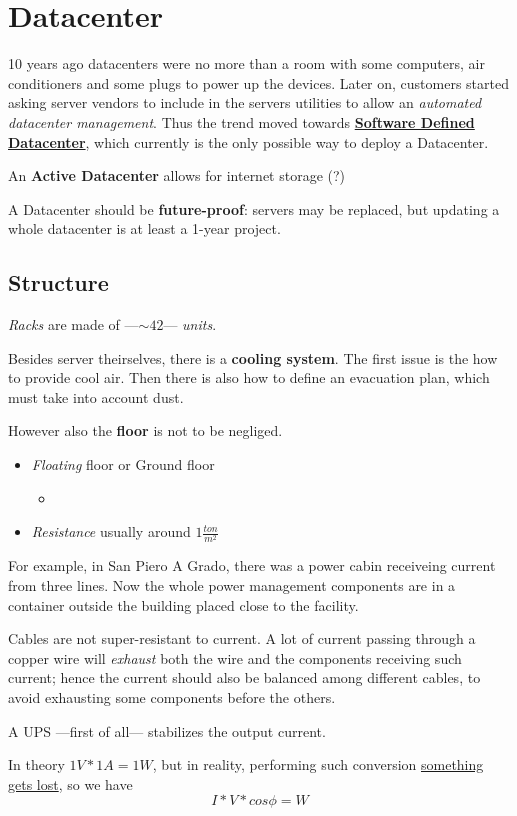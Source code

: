 \chapter{Datacenter}
10 years ago datacenters were no more than a room with some computers, air conditioners and some plugs to power up the devices.
Later on, customers started asking server vendors to include in the servers utilities to allow an \textit{automated datacenter management}.
Thus the trend moved towards \textbf{\ul{Software Defined Datacenter}}, which currently is the only possible way to deploy a Datacenter.

An \textbf{Active Datacenter} allows for internet storage (?)

A Datacenter should be \textbf{future-proof}: servers may be replaced, but updating a whole datacenter is at least a 1-year project.

\section{Structure}
\textit{Racks} are made of ---$\sim 42$--- \textit{units}.

Besides server theirselves, there is a \textbf{cooling system}.
The first issue is the how to provide cool air. Then there is also how to define an evacuation plan, which must take into account dust.

However also the \textbf{floor} is not to be negliged.
\begin{itemize}
   \item \textit{Floating} floor or Ground floor
   \begin{itemize}
      \item 
   \end{itemize}
   \item \textit{Resistance} usually around $1 \frac{ton}{m^2}$  
\end{itemize}

For example, in San Piero A Grado, there was a power cabin receiveing current from three lines.
Now the whole power management components are in a container outside the building placed close to the facility.

Cables are not super-resistant to current. A lot of current passing through a copper wire will \textit{exhaust} both the wire and the components receiving such current;
hence the current should also be balanced among different cables, to avoid exhausting some components before the others.


A UPS ---first of all--- stabilizes the output current.

In theory $1V * 1A = 1W$, but in reality, performing such conversion \ul{something gets lost}, so we have
\[I * V * cos \phi = W\]
